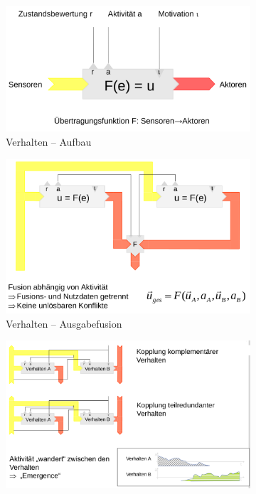 \begin{figure}
	\begin{subfigure}{.5\textwidth}
		\centering
		\includegraphics[width=\textwidth]{figures/verhalten_aufbau.png}
		\caption{Verhalten -- Aufbau}
	\end{subfigure}
	\begin{subfigure}{.5\textwidth}
		\centering
		\includegraphics[width=\textwidth]{figures/verhalten_ausgabefusion.png}
		\caption{Verhalten -- Ausgabefusion}
	\end{subfigure}\par\medskip
	\begin{subfigure}{.5\textwidth}
		\centering
		\includegraphics[width=\textwidth]{figures/verhalten_kopplung.png}

\end{subfigure}
\end{figure}
